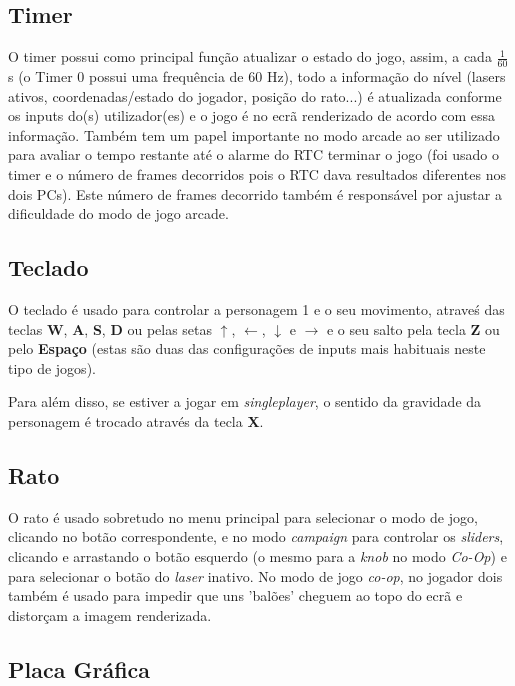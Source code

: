 \documentclass{report}
\begin{document}
\subsection{Timer}

O timer possui como principal função atualizar o estado do jogo, assim, a cada $\frac{1}{60}$s (o Timer 0 possui uma frequência de 60 Hz), todo a informação do nível (lasers ativos, coordenadas/estado do jogador, posição do rato...) é atualizada conforme os inputs do(s) utilizador(es) e o jogo é no ecrã renderizado de acordo com essa informação.
Também tem um papel importante no modo arcade ao ser utilizado para avaliar o tempo restante até o alarme do RTC terminar o jogo (foi usado o timer e o número de frames decorridos pois o RTC dava resultados diferentes nos dois PCs). Este número de frames decorrido também é responsável por ajustar a dificuldade do modo de jogo arcade.

\subsection{Teclado}

O teclado é usado para controlar a personagem 1 e o seu movimento, atraveś das teclas \textbf{W}, \textbf{A}, \textbf{S}, \textbf{D} ou pelas setas $\uparrow$, $\leftarrow$, $\downarrow$ e $\rightarrow$ e o seu salto pela tecla \textbf{Z} ou pelo \textbf{Espaço} (estas são duas das configurações de inputs mais habituais neste tipo de jogos).

Para além disso, se estiver a jogar em \textit{singleplayer}, o sentido da gravidade da personagem é trocado através da tecla \textbf{X}.

\subsection{Rato}


O rato é usado sobretudo no menu principal para selecionar o modo de jogo, clicando no botão correspondente, e no modo \textit{campaign} para controlar os \textit{sliders}, clicando e arrastando o botão esquerdo (o mesmo para a \textit{knob} no modo \textit{Co-Op}) e para selecionar o botão do \textit{laser} inativo.  
No modo de jogo \textit{co-op}, no jogador dois também é usado para impedir que uns 'balões' cheguem ao topo do ecrã e distorçam a imagem renderizada.

\subsection{Placa Gráfica}
\end{document}
